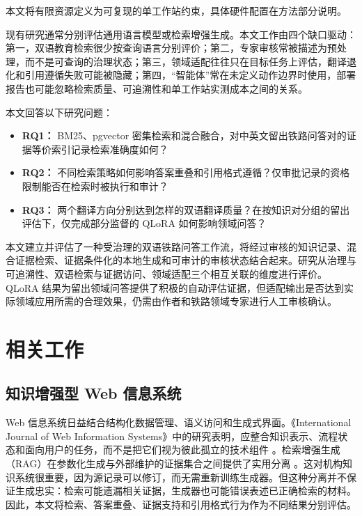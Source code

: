 本文将有限资源定义为可复现的单工作站约束，具体硬件配置在方法部分说明。

现有研究通常分别评估通用语言模型或检索增强生成。本文工作由四个缺口驱动：第一，双语教育检索很少按查询语言分别评价；第二，专家审核常被描述为预处理，而不是可查询的治理状态；第三，领域适配往往只在目标任务上评估，翻译退化和引用遵循失败可能被隐藏；第四，“智能体”常在未定义动作边界时使用，部署报告也可能忽略检索质量、可追溯性和单工作站实测成本之间的关系。

本文回答以下研究问题：

\begin{itemize}
\item \textbf{RQ1：} BM25、pgvector 密集检索和混合融合，对中英文留出铁路问答对的证据等价索引记录检索准确度如何？
\item \textbf{RQ2：} 不同检索策略如何影响答案重叠和引用格式遵循？仅审批记录的资格限制能否在检索时被执行和审计？
\item \textbf{RQ3：} 两个翻译方向分别达到怎样的双语翻译质量？在按知识对分组的留出评估下，仅完成部分监督的 QLoRA 如何影响领域问答？
\end{itemize}

本文建立并评估了一种受治理的双语铁路问答工作流，将经过审核的知识记录、混合证据检索、证据条件化的本地生成和可审计的审核状态结合起来。研究从治理与可追溯性、双语检索与证据访问、领域适配三个相互关联的维度进行评价。QLoRA 结果为留出领域问答提供了积极的自动评估证据，但适配输出是否达到实际领域应用所需的合理效果，仍需由作者和铁路领域专家进行人工审核确认。

\section{相关工作}

\subsection{知识增强型 Web 信息系统}

Web 信息系统日益结合结构化数据管理、语义访问和生成式界面。《International Journal of Web Information Systems》中的研究表明，应整合知识表示、流程状态和面向用户的任务，而不是把它们视为彼此孤立的技术组件 \citep{hubscher2021knowledge}。检索增强生成（RAG）在参数化生成与外部维护的证据集合之间提供了实用分离 \citep{lewis2020rag}。这对机构知识系统很重要，因为源记录可以修订，而无需重新训练生成器。但这种分离并不保证生成忠实：检索可能遗漏相关证据，生成器也可能错误表述已正确检索的材料。因此，本文将检索、答案重叠、证据支持和引用格式行为作为不同结果分别评估。

